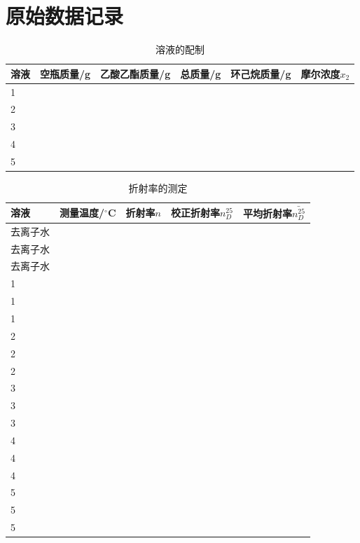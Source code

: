 \documentclass[a4paper]{article}
\begin{document}
\section*{原始数据记录}
\begin{table}[H]
	\caption{溶液的配制}
	\begin{center}
		\begin{tabular}{l|l|l|l|l|l}
			\hline
			溶液 & 空瓶质量/g & 乙酸乙酯质量/g & 总质量/g & 环己烷质量/g & 摩尔浓度$x_{2}$\\
			\hline
			1	&	&	&	&	&	\\
			\hline
			2	&	&	&	&	&	\\
			\hline
			3	&	&	&	&	&	\\
			\hline
			4	&	&	&	&	&	\\
			\hline
			5	&	&	&	&	&	\\
			\hline
		\end{tabular}
	\end{center}
\end{table}
\begin{table}[H]
	\caption{折射率的测定}
	\begin{center}
		\begin{tabular}{l|l|l|l|l}
			\hline
			溶液 & 测量温度/$^\circ$C & 折射率$n$ & 校正折射率$n_{D}^{25}$ & 平均折射率$\bar{n_{D}^{25}}$\\
			\hline
			去离子水&	&	&	&	\\
			\hline
			去离子水&	&	&	&	\\
			\hline
			去离子水&	&	&	&	\\
			\hline
			1	&	&	&	&	\\
			\hline
			1	&	&	&	&	\\
			\hline
			1	&	&	&	&	\\
			\hline
			2	&	&	&	&	\\
			\hline
			2	&	&	&	&	\\
			\hline
			2	&	&	&	&	\\
			\hline
			3	&	&	&	&	\\
			\hline
			3	&	&	&	&	\\
			\hline
			3	&	&	&	&	\\
			\hline
			4	&	&	&	&	\\
			\hline
			4	&	&	&	&	\\
			\hline
			4	&	&	&	&	\\
			\hline
			5	&	&	&	&	\\
			\hline
			5	&	&	&	&	\\
			\hline
			5	&	&	&	&	\\
			\hline
		\end{tabular}
	\end{center}
\end{table}
\end{document}

